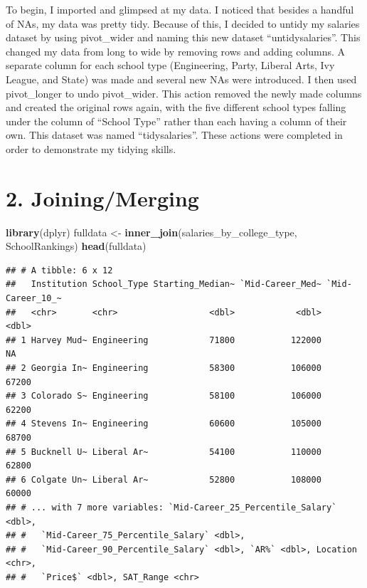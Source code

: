 \documentclass[]{article}
\newenvironment{Shaded}{\begin{snugshade}}{\end{snugshade}}
\newcommand{\KeywordTok}[1]{\textcolor[rgb]{0.13,0.29,0.53}{\textbf{#1}}}
\newcommand{\StringTok}[1]{\textcolor[rgb]{0.31,0.60,0.02}{#1}}
\newcommand{\NormalTok}[1]{#1}
\begin{document}
To begin, I imported and glimpsed at my data. I noticed that besides a
handful of NAs, my data was pretty tidy. Because of this, I decided to
untidy my salaries dataset by using pivot\_wider and naming this new
dataset ``untidysalaries''. This changed my data from long to wide by
removing rows and adding columns. A separate column for each school type
(Engineering, Party, Liberal Arts, Ivy League, and State) was made and
several new NAs were introduced. I then used pivot\_longer to undo
pivot\_wider. This action removed the newly made columns and created the
original rows again, with the five different school types falling under
the column of ``School Type'' rather than each having a column of their
own. This dataset was named ``tidysalaries''. These actions were
completed in order to demonstrate my tidying skills.

\section{2. Joining/Merging}\label{joiningmerging}

\begin{Shaded}
\begin{Highlighting}[]
\KeywordTok{library}\NormalTok{(dplyr)}
\NormalTok{fulldata <-}\StringTok{ }\KeywordTok{inner_join}\NormalTok{(salaries_by_college_type, SchoolRankings)}
\KeywordTok{head}\NormalTok{(fulldata)}
\end{Highlighting}
\end{Shaded}

\begin{verbatim}
## # A tibble: 6 x 12
##   Institution School_Type Starting_Median~ `Mid-Career_Med~ `Mid-Career_10_~
##   <chr>       <chr>                  <dbl>            <dbl>            <dbl>
## 1 Harvey Mud~ Engineering            71800           122000               NA
## 2 Georgia In~ Engineering            58300           106000            67200
## 3 Colorado S~ Engineering            58100           106000            62200
## 4 Stevens In~ Engineering            60600           105000            68700
## 5 Bucknell U~ Liberal Ar~            54100           110000            62800
## 6 Colgate Un~ Liberal Ar~            52800           108000            60000
## # ... with 7 more variables: `Mid-Career_25_Percentile_Salary` <dbl>,
## #   `Mid-Career_75_Percentile_Salary` <dbl>,
## #   `Mid-Career_90_Percentile_Salary` <dbl>, `AR%` <dbl>, Location <chr>,
## #   `Price$` <dbl>, SAT_Range <chr>
\end{verbatim}
\end{document}

